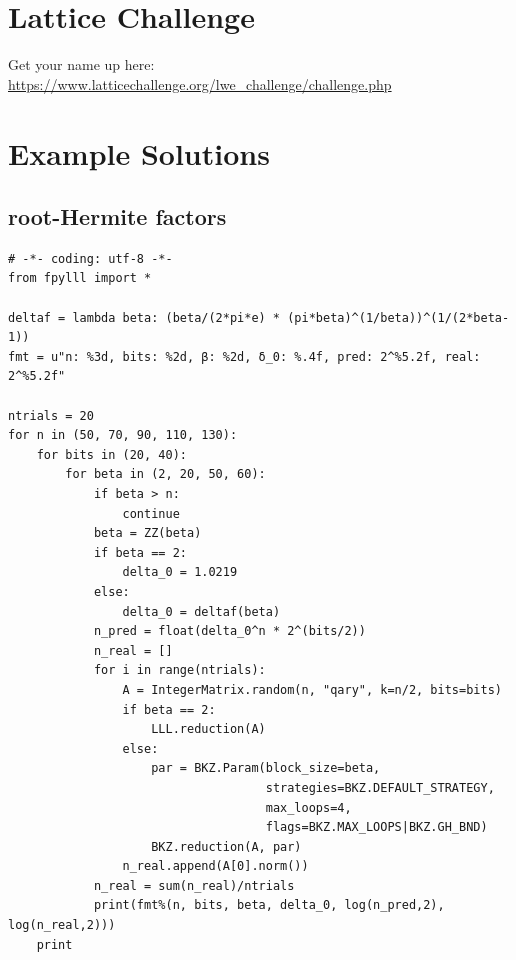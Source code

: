 \documentclass[10pt,a4paper,nobib]{tufte-handout}
\begin{document}
\section{Lattice Challenge}
\label{sec:orgadbc55d}

Get your name up here: \url{https://www.latticechallenge.org/lwe\_challenge/challenge.php}

\appendix

\section{Example Solutions}
\label{sec:orgda5fee6}
\subsection{root-Hermite factors}
\label{sec:orgb4dce8a}

\lstset{language=sage,label= ,caption= ,captionpos=b,numbers=none}
\begin{lstlisting}
# -*- coding: utf-8 -*-
from fpylll import *

deltaf = lambda beta: (beta/(2*pi*e) * (pi*beta)^(1/beta))^(1/(2*beta-1))
fmt = u"n: %3d, bits: %2d, β: %2d, δ_0: %.4f, pred: 2^%5.2f, real: 2^%5.2f"

ntrials = 20
for n in (50, 70, 90, 110, 130):
    for bits in (20, 40):
        for beta in (2, 20, 50, 60):
            if beta > n:
                continue
            beta = ZZ(beta)
            if beta == 2:
                delta_0 = 1.0219
            else:
                delta_0 = deltaf(beta)
            n_pred = float(delta_0^n * 2^(bits/2))
            n_real = []
            for i in range(ntrials):
                A = IntegerMatrix.random(n, "qary", k=n/2, bits=bits)
                if beta == 2:
                    LLL.reduction(A)
                else:
                    par = BKZ.Param(block_size=beta,
                                    strategies=BKZ.DEFAULT_STRATEGY,
                                    max_loops=4,
                                    flags=BKZ.MAX_LOOPS|BKZ.GH_BND)
                    BKZ.reduction(A, par)
                n_real.append(A[0].norm())
            n_real = sum(n_real)/ntrials
            print(fmt%(n, bits, beta, delta_0, log(n_pred,2), log(n_real,2)))
    print
\end{lstlisting}
\end{document}
